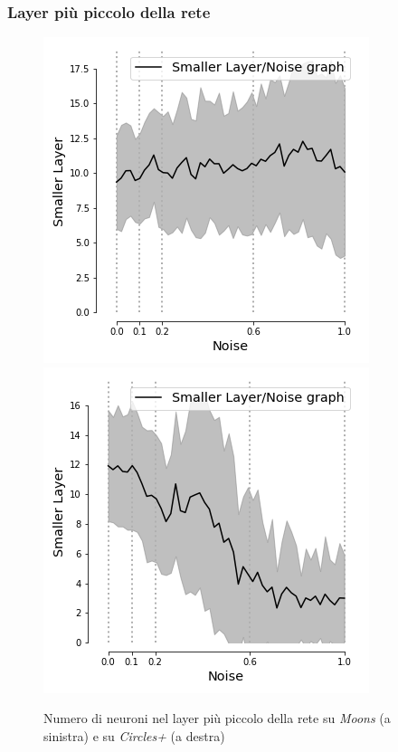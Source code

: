 \documentclass{beamer}
\begin{document}
\begin{frame}
 \frametitle{Layer più piccolo della rete }
    \begin{figure}
    \includegraphics[scale = 0.42]{images/small_noise_moons.png}
    \includegraphics[scale = 0.42]{images/small_noise_circles+.png}
    \caption{\large Numero di neuroni nel layer più piccolo della rete su \textit{Moons} (a sinistra) e su \textit{Circles+} (a destra)}
 \end{figure}
\end{frame}
\end{document}
